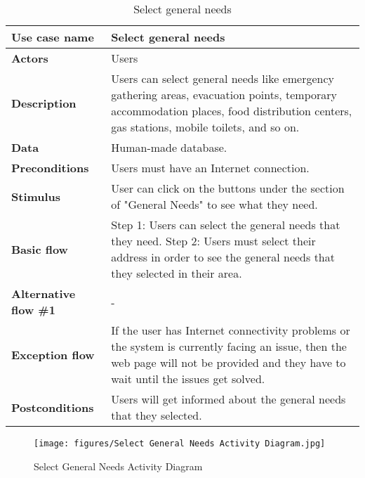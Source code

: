 \documentclass[listof=nochaptergap]{report}
\begin{document}
    \begin{table}[H]
        \centering
         \begin{tabular}{| p{4cm} | p{10cm} |} 
         \hline
         \textbf{Use case name} & Select general needs \\
         \hline
         \textbf{Actors} & Users \\
         \hline
         \textbf{Description} & Users can select general needs like emergency gathering areas, evacuation points, temporary accommodation places, food distribution centers, gas stations, mobile toilets, and so on. \\
         \hline
         \textbf{Data} & Human-made database. \\
         \hline
         \textbf{Preconditions} & Users must have an Internet connection. \\
         \hline
         \textbf{Stimulus} & User can click on the buttons under the section of "General Needs" to see what they need. \\
         \hline
         \textbf{Basic flow} & Step 1: Users can select the general needs that they need. \newline Step 2: Users must select their address in order to see the general needs that they selected in their area. \\
         \hline
         \textbf{Alternative flow \#1} & - \\
         \hline
         \textbf{Exception flow} & If the user has Internet connectivity problems or the system is currently facing an issue, then the web page will not be provided and they have to wait until the issues get solved. \\
         \hline
         \textbf{Postconditions} & Users will get informed about the general needs that they selected. \\
         \hline
         \end{tabular}
        \caption{Select general needs}
        \label{tab:table7}
    \end{table}

        \begin{center}
            \begin{figure}[H]
                \centering
                \texttt{[image: figures/Select General Needs Activity Diagram.jpg]}
                \caption{Select General Needs Activity Diagram} 
                \label{fig:figure1}
            \end{figure}
        \end{center}
\end{document}

